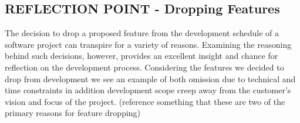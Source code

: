 \documentclass{l3proj}
\begin{document}
\subsection{REFLECTION POINT - Dropping Features}
\label{sec:droppingreflection}



The decision to drop a proposed feature from the development schedule of a software project can transpire for a variety of reasons. Examining the reasoning behind such decisions, however, provides an excellent insight and chance for reflection on the development process. Considering the features we decided to drop from development we see an example of both omission due to technical and time constraints in addition development scope creep away from the customer's vision and focus of the project. (reference something that these are two of the primary reasons for feature dropping)
\end{document}
